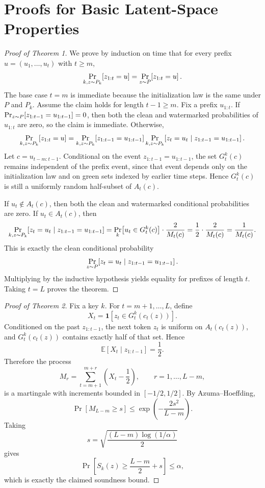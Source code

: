 \documentclass[12pt]{article}
\begin{document}
\clearpage
\appendix

\section{Proofs for Basic Latent-Space Properties}

\begin{proof}[Proof of Theorem 1]
We prove by induction on time that for every prefix
$u=(u_1,\dots,u_t)$ with $t\ge m$,
\[
\Prob[k,z\sim P_k]{z_{1:t}=u}=\Prob[z\sim P]{z_{1:t}=u}.
\]
The base case $t=m$ is immediate because the initialization law is the
same under $P$ and $P_k$. Assume the claim holds for length
$t-1\ge m$. Fix a prefix $u_{1:t}$. If
$\Prob[z\sim P]{z_{1:t-1}=u_{1:t-1}}=0$, then both the clean and
watermarked probabilities of $u_{1:t}$ are zero, so the claim is
immediate. Otherwise,
\[
\Prob[k,z\sim P_k]{z_{1:t}=u}
=
\Prob[k,z\sim P_k]{z_{1:t-1}=u_{1:t-1}}
\Prob[k,z\sim P_k]{z_t=u_t \mid z_{1:t-1}=u_{1:t-1}}.
\]
Let $c=u_{t-m:t-1}$. Conditional on the event
$z_{1:t-1}=u_{1:t-1}$, the set $G_t^k(c)$ remains independent of the
prefix event, since that event depends only on the initialization law
and on green sets indexed by earlier time steps. Hence $G_t^k(c)$ is
still a uniformly random half-subset of $A_t(c)$.

If $u_t\notin A_t(c)$, then both the clean and watermarked conditional
probabilities are zero. If $u_t\in A_t(c)$, then
\[
\Prob[k,z\sim P_k]{z_t=u_t \mid z_{1:t-1}=u_{1:t-1}}
=
\Prob[k]{u_t\in G_t^k(c)}\cdot \frac{2}{M_t(c)}
=
\frac{1}{2}\cdot \frac{2}{M_t(c)}
=
\frac{1}{M_t(c)}.
\]
This is exactly the clean conditional probability
\[
\Prob[z\sim P]{z_t=u_t\mid z_{1:t-1}=u_{1:t-1}}.
\]
Multiplying by the inductive hypothesis yields equality for prefixes of
length $t$. Taking $t=L$ proves the theorem.
\end{proof}

\begin{proof}[Proof of Theorem 2]
Fix a key $k$. For $t=m+1,\dots,L$, define
\[
X_t = \mathbf{1}[z_t\in G_t^k(c_t(z))].
\]
Conditioned on the past $z_{1:t-1}$, the next token $z_t$ is uniform on
$A_t(c_t(z))$, and $G_t^k(c_t(z))$ contains exactly half of that set.
Hence
\[
\mathbb{E}[X_t \mid z_{1:t-1}] = \frac{1}{2}.
\]
Therefore the process
\[
M_r=\sum_{t=m+1}^{m+r}\left(X_t-\frac{1}{2}\right),
\qquad r=1,\dots,L-m,
\]
is a martingale with increments bounded in $[-1/2,1/2]$. By
Azuma--Hoeffding,
\[
\Pr\!\left[M_{L-m}\ge s\right] \le
\exp\!\left(-\frac{2s^2}{L-m}\right).
\]
Taking
\[
s=\sqrt{\frac{(L-m)\log(1/\alpha)}{2}}
\]
gives
\[
\Pr\!\left[S_k(z)\ge \frac{L-m}{2}+s\right]\le \alpha,
\]
which is exactly the claimed soundness bound.
\end{proof}
\end{document}
